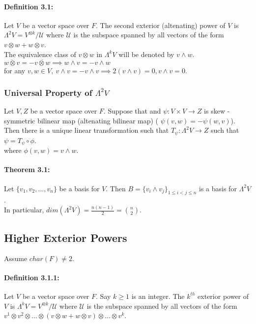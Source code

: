 \documentclass{article}
\begin{document}
\paragraph{Definition 3.1:}  Let $V$ be a vector space over $F$. The  second exterior (altenating) power of $V$ is  $\Lambda^2V = V^{\otimes k}/\mathcal{U}$ where $\mathcal{U}$ is the subspace spanned by all vectors of the form $v\otimes w + w\otimes v$.\\
The equivalence class of $v\otimes w$ in $\Lambda^k V$ will be denoted by $v\wedge w$.\\

$\overline{w\otimes v} = - \overline{v\otimes w} \implies w\wedge v = -v\wedge w  $ \\

for any $v,w\in V,  \ v\wedge v = - v\wedge v \implies 2(v\wedge v)=0, v\wedge v =0 $.\\  
\subsubsection{Universal Property of $\Lambda^2V$}
Let $V, Z$ be a vector space over $F$. Suppose that and $\psi:V\times V \rightarrow Z$ is skew - symmetric bilinear map (altenating bilinear map) ( $\psi(v,w) = -\psi(w,v)$). 
Then there is a unique linear transformation such that $T_\psi:\Lambda^2V\rightarrow Z$ such that $\psi = T_\psi \circ \phi $.\\
where $\phi(v,w) = v\wedge w$.\\

\paragraph{Theorem 3.1:} Let $\{v_1,v_2,...,v_n\}$ be a basis for $V$. Then $B= \{v_i \wedge v_j\}_{1\leq i< j \leq n}$ is a basis for $\Lambda^2V$.\\
In particular, $dim(\Lambda^2V) = \frac{n(n-1)}{2}= {n \choose 2}$.\\

\subsection{Higher Exterior Powers}
Assume $char(F)\neq 2$.\\
\paragraph{Definition 3.1.1:}  Let $V$ be a vector space over $F$. Say $k\geq 1$ is an integer. The  $k^{th}$ exterior power of $V$ is  $\Lambda^kV = V^{\otimes k}/\mathcal{U}$ where $\mathcal{U}$ is the subspace spanned by all vectors of the form $v^1\otimes v^2\otimes...\otimes( v\otimes w+w\otimes v) \otimes...\otimes v^k$. \\
\end{document}
